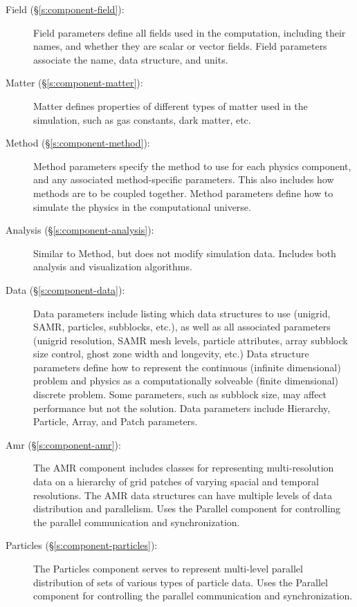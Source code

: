 \begin{description}
 \item [Field (\S\ref{s:component-field}): ] Field parameters define all fields
 used in the computation, including their names, and whether they are
 scalar or vector fields.  Field parameters associate the name,
 data structure, and units.

 \item [Matter (\S\ref{s:component-matter}): ] Matter defines properties of
 different types of matter used in the simulation, such as gas
 constants, dark matter, etc.

 \item [Method (\S\ref{s:component-method}): ] Method parameters specify the
 method to use for each physics component, and any associated
 method-specific parameters.  This also includes how methods are to be
 coupled together.  Method parameters define how to simulate the
 physics in the computational universe.

 \item [Analysis (\S\ref{s:component-analysis}): ]  Similar to Method, but
 does not modify simulation data.  Includes both analysis and visualization
 algorithms.

 \item [Data (\S\ref{s:component-data}): ] Data parameters include listing which
 data structures to use (unigrid, SAMR, particles, subblocks, etc.),
 as well as all associated parameters (unigrid resolution, SAMR mesh
 levels, particle attributes, array subblock size control, ghost zone
 width and longevity, etc.)  Data structure parameters define how to
 represent the continuous (infinite dimensional) problem and physics
 as a computationally solveable (finite dimensional) discrete problem.
 Some parameters, such as subblock size, may affect performance but
 not the solution.  Data parameters include Hierarchy, Particle,
 Array, and Patch parameters.

 \item [Amr (\S\ref{s:component-amr}): ] The AMR component includes
 classes for representing multi-resolution data on a hierarchy of grid
 patches of varying spacial and temporal resolutions.  The AMR data
 structures can have multiple levels of data distribution and
 parallelism.  Uses the Parallel component for controlling the
 parallel communication and synchronization.

 \item [Particles (\S\ref{s:component-particles}): ]  The Particles component
  serves to represent multi-level parallel distribution of sets of various
  types of particle data.   Uses the Parallel component for controlling the
  parallel communication and synchronization.


\end{description}
